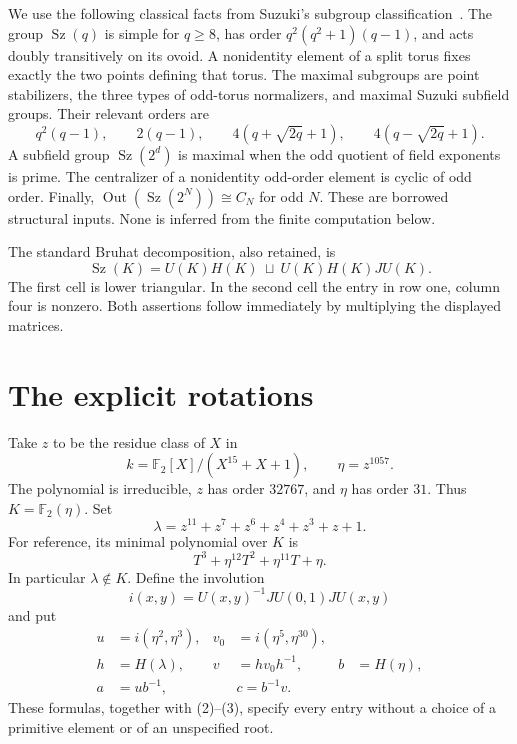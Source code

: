 \documentclass[11pt,a4paper]{article}
\newcommand{\Sz}{\operatorname{Sz}}
\newcommand{\F}{\mathbb F}
\begin{document}
We use the following classical facts from Suzuki's subgroup
classification~\cite{Suzuki}. The group $\Sz(q)$ is simple for
$q\geq8$, has order $q^2(q^2+1)(q-1)$, and acts doubly transitively
on its ovoid. A nonidentity element of a split torus fixes exactly the
two points defining that torus. The maximal subgroups are point
stabilizers, the three types of odd-torus normalizers, and maximal
Suzuki subfield groups. Their relevant orders are
\[
 q^2(q-1),\qquad 2(q-1),\qquad
 4(q+\sqrt{2q}+1),\qquad4(q-\sqrt{2q}+1).
\]
A subfield group $\Sz(2^d)$ is maximal when the odd quotient of field
exponents is prime. The centralizer of a nonidentity odd-order element
is cyclic of odd order. Finally,
$\operatorname{Out}(\Sz(2^N))\cong C_N$ for odd $N$.
These are borrowed structural inputs. None is inferred from the
finite computation below.

The standard Bruhat decomposition, also retained, is
\[
 \Sz(K)=U(K)H(K)\ \sqcup\ U(K)H(K)J U(K).
 \tag{1}
\]
The first cell is lower triangular. In the second cell the entry in
row one, column four is nonzero. Both assertions follow immediately
by multiplying the displayed matrices.

\section{The explicit rotations}
Take $z$ to be the residue class of $X$ in
\[
 k=\F_2[X]/(X^{15}+X+1),\qquad \eta=z^{1057}.
 \tag{2}
\]
The polynomial is irreducible, $z$ has order $32767$, and $\eta$ has
order $31$. Thus $K=\F_2(\eta)$. Set
\[
 \lambda=z^{11}+z^7+z^6+z^4+z^3+z+1.
 \tag{3}
\]
For reference, its minimal polynomial over $K$ is
\[
 T^3+\eta^{12}T^2+\eta^{11}T+\eta.
 \tag{4}
\]
In particular $\lambda\notin K$.
Define the involution
\[
 i(x,y)=U(x,y)^{-1}J U(0,1)J U(x,y)
\]
and put
\[
 \begin{aligned}
 u&=i(\eta^2,\eta^3),&v_0&=i(\eta^5,\eta^{30}),\\
 h&=H(\lambda),&v&=h v_0h^{-1},&b&=H(\eta),\\
 a&=u b^{-1},&&c=b^{-1}v.
 \end{aligned}
 \tag{5}
\]
These formulas, together with (2)--(3), specify every entry without a
choice of a primitive element or of an unspecified root.
\end{document}
